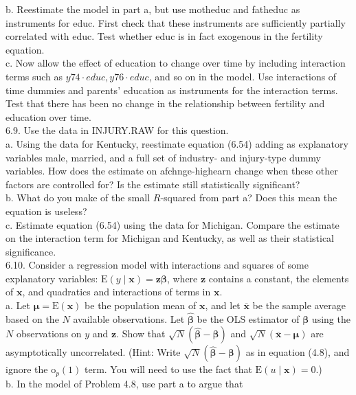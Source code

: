\documentclass[10pt]{article}
\begin{document}
b. Reestimate the model in part a, but use motheduc and fatheduc as instruments for educ. First check that these instruments are sufficiently partially correlated with educ. Test whether educ is in fact exogenous in the fertility equation.\\
c. Now allow the effect of education to change over time by including interaction terms such as $y 74 \cdot e d u c, y 76 \cdot e d u c$, and so on in the model. Use interactions of time dummies and parents' education as instruments for the interaction terms. Test that there has been no change in the relationship between fertility and education over time.\\
6.9. Use the data in INJURY.RAW for this question.\\
a. Using the data for Kentucky, reestimate equation (6.54) adding as explanatory variables male, married, and a full set of industry- and injury-type dummy variables. How does the estimate on afchnge-highearn change when these other factors are controlled for? Is the estimate still statistically significant?\\
b. What do you make of the small $R$-squared from part a? Does this mean the equation is useless?\\
c. Estimate equation (6.54) using the data for Michigan. Compare the estimate on the interaction term for Michigan and Kentucky, as well as their statistical significance.\\
6.10. Consider a regression model with interactions and squares of some explanatory variables: $\mathrm{E}(y \mid \mathbf{x})=\mathbf{z} \boldsymbol{\beta}$, where $\mathbf{z}$ contains a constant, the elements of $\mathbf{x}$, and quadratics and interactions of terms in $\mathbf{x}$.\\
a. Let $\boldsymbol{\mu}=\mathrm{E}(\mathbf{x})$ be the population mean of $\mathbf{x}$, and let $\overline{\mathbf{x}}$ be the sample average based on the $N$ available observations. Let $\hat{\boldsymbol{\beta}}$ be the OLS estimator of $\boldsymbol{\beta}$ using the $N$ observations on $y$ and $\mathbf{z}$. Show that $\sqrt{N}(\hat{\boldsymbol{\beta}}-\boldsymbol{\beta})$ and $\sqrt{N}(\overline{\mathbf{x}}-\boldsymbol{\mu})$ are asymptotically uncorrelated. (Hint: Write $\sqrt{N}(\hat{\boldsymbol{\beta}}-\boldsymbol{\beta})$ as in equation (4.8), and ignore the $\mathrm{o}_{p}(1)$ term. You will need to use the fact that $\mathrm{E}(u \mid \mathbf{x})=0$.)\\
b. In the model of Problem 4.8, use part a to argue that\\
\end{document}
